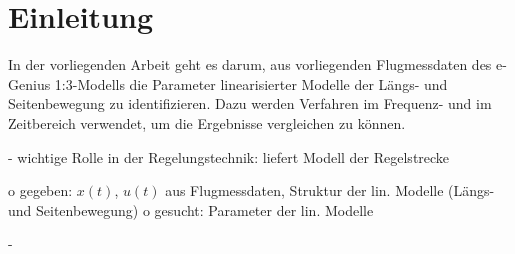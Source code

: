 \chapter{Einleitung}

In der vorliegenden Arbeit geht es darum, aus vorliegenden Flugmessdaten des e-Genius 1:3-Modells die Parameter 
linearisierter Modelle der Längs- und Seitenbewegung zu identifizieren. Dazu werden Verfahren im Frequenz- und im Zeitbereich 
verwendet, um die Ergebnisse vergleichen zu können.

- wichtige Rolle in der Regelungstechnik: liefert Modell der Regelstrecke

	o gegeben: 	$ x(t) $, $ u(t) $ aus Flugmessdaten, Struktur der lin. Modelle (Längs- und Seitenbewegung)
	o gesucht: 	Parameter der lin. Modelle

- 